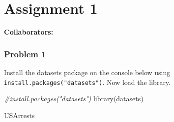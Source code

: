 \documentclass[
]{article}
\newenvironment{Shaded}{\begin{snugshade}}{\end{snugshade}}
\newcommand{\CommentTok}[1]{\textcolor[rgb]{0.56,0.35,0.01}{\textit{#1}}}
\newcommand{\FunctionTok}[1]{\textcolor[rgb]{0.00,0.00,0.00}{#1}}
\newcommand{\NormalTok}[1]{#1}
\begin{document}
\hypertarget{assignment-1}{%
\section{Assignment 1}\label{assignment-1}}

\textbf{Collaborators: }

\hypertarget{problem-1}{%
\subsubsection{Problem 1}\label{problem-1}}

Install the datasets package on the console below using
\texttt{install.packages("datasets")}. Now load the library.

\begin{Shaded}
\begin{Highlighting}[]
\CommentTok{\#install.packages("datasets")}
\FunctionTok{library}\NormalTok{(datasets)}

\NormalTok{USArrests}
\end{Highlighting}
\end{Shaded}
\end{document}
